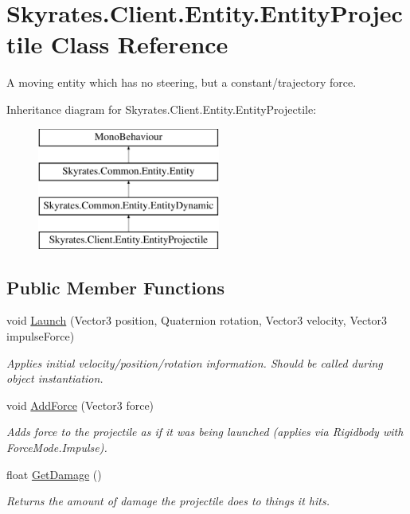 \hypertarget{class_skyrates_1_1_client_1_1_entity_1_1_entity_projectile}{\section{Skyrates.\-Client.\-Entity.\-Entity\-Projectile Class Reference}
\label{class_skyrates_1_1_client_1_1_entity_1_1_entity_projectile}
}


A moving entity which has no steering, but a constant/trajectory force.  


Inheritance diagram for Skyrates.\-Client.\-Entity.\-Entity\-Projectile\-:\begin{figure}[H]
\begin{center}
\leavevmode
\includegraphics[height=4.000000cm]{class_skyrates_1_1_client_1_1_entity_1_1_entity_projectile}
\end{center}
\end{figure}
\subsection*{Public Member Functions}
\begin{DoxyCompactItemize}
\item 
void \hyperlink{class_skyrates_1_1_client_1_1_entity_1_1_entity_projectile_ae87c3834fc03c2315b321b79375d68c8}{Launch} (Vector3 position, Quaternion rotation, Vector3 velocity, Vector3 impulse\-Force)
\begin{DoxyCompactList}\small\item\em Applies initial velocity/position/rotation information. Should be called during object instantiation. \end{DoxyCompactList}\item 
void \hyperlink{class_skyrates_1_1_client_1_1_entity_1_1_entity_projectile_a08b0c20d4fb41a9e32f9bae06887cc49}{Add\-Force} (Vector3 force)
\begin{DoxyCompactList}\small\item\em Adds force to the projectile as if it was being launched (applies via Rigidbody with Force\-Mode.\-Impulse). \end{DoxyCompactList}\item 
float \hyperlink{class_skyrates_1_1_client_1_1_entity_1_1_entity_projectile_a287e94a57d97586e9ef38d2af588129d}{Get\-Damage} ()
\begin{DoxyCompactList}\small\item\em Returns the amount of damage the projectile does to things it hits. \end{DoxyCompactList}\end{DoxyCompactItemize}
